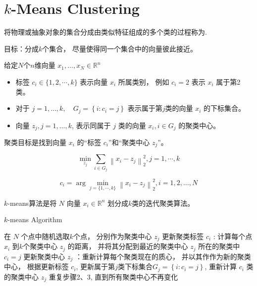 \section{$k$-Means Clustering}

将物理或抽象对象的集合分成由类似特征组成的多个类的过程称为.



目标：分成$k$个集合， 尽量使得同一个集合中的向量彼此接近。 

\begin{notation}
    给定$N$个$n$维向量 $ x_{1}, \ldots, x_{N} \in \mathbb{R}^{n} $

    \begin{itemize}
        \item 标签 $ c_{i} \in\{1,2, \cdots, k\} $ 表示向量 $ x_{i} $ 所属类别， 例如 $ c_{i}=2 $ 表示 $ x_{i} $ 属于第2类。 
        \item 对于 $ j=1, \ldots, k, \quad G_{j}=\left\{i: c_{i}=j\right\} $ 表示属于第$j$类的向量 $ x_{i} $ 的下标集合。 
        \item 向量 $ z_{j}, j=1, \ldots, k $, 表示同属于 $ j $ 类的向量 $ x_{i}, i \in G_{j} $ 的聚类中心。 
    \end{itemize}
\end{notation}

聚类目标是找到向量 $ x_{i} $ 的“标签 $ c_{i} $”和“聚类中心 $ z_{j} $”。

\begin{problem}
    \begin{equation} \min _{z_{j}} \sum_{i \in G_{j}}\left\|x_{i}-z_{j}\right\|_{2}^{2}, j=1, \cdots, k \end{equation}

    \begin{equation} c_{i}=
    \arg \min_{j=\{1, \cdots, k\}} \left\|x_{i}-z_{j}\right\|_{2}^{2}, i=1,2, \ldots, N \end{equation}

    
\end{problem}

$k$-means算法是将 $ {N} $ 向量 $ x_{i} \in \mathbb{R}^{n} $ 划分成$k$类的迭代聚类算法。 

\begin{algorithm}
    \caption{$k$-means Algorithm}
    在 $ {N} $ 个点中随机选取$k$个点， 分别作为聚类中心 $ z_{j} $\;
    更新聚类标签 $ c_{i} $ : 计算每个点 $ x_{i} $ 到$k$个聚类中心 $ z_{j} $ 的距离， 并将其分配到最近的聚类中心 $ z_{j} $ 所在的聚类中 $ c_{i}=j $\;
    更新聚类中心 $ z_{j} $ ：重新计算每个聚类现在的质心， 并以其作作为新的聚类中心， 根据更新标签 $ c_{i} $, 更新属于第$j$类下标集合$ G_{j}=\left\{i: c_{i}=j\right\} $, 重新计算 $ c_{i} $ 类的聚类中心 $ z_{j} $\;
    重复步骤2、3, 直到所有聚类中心不再变化
\end{algorithm}


